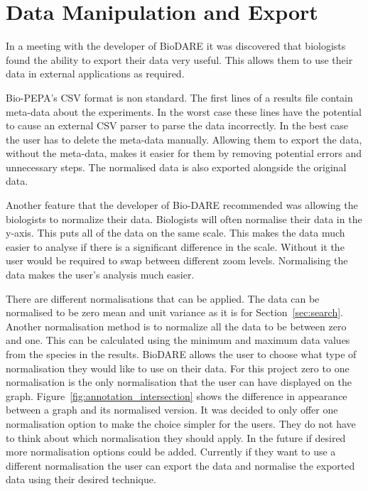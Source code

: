 \section{Data Manipulation and Export}
\label{sec:normalised}

In a meeting with the developer of BioDARE it was discovered that biologists found the ability to export their data very useful.  This allows them to use their data in external applications as required.

Bio-PEPA's CSV format is non standard.  The first lines of a results file contain meta-data about the experiments.  In the worst case these lines have the potential to cause an external CSV parser to parse the data incorrectly.  In the best case the user has to delete the meta-data manually.  Allowing them to export the data, without the meta-data, makes it easier for them by removing potential errors and unnecessary steps.  The normalised data is also exported alongside the original data.

Another feature that the developer of Bio-DARE recommended was allowing the biologists to normalize their data.  Biologists will often normalise their data in the y-axis.  This puts all of the data on the same scale.  This makes the data much easier to analyse if there is a significant difference in the scale.  Without it the user would be required to swap between different zoom levels.  Normalising the data makes the user's analysis much easier.

There are different normalisations that can be applied.  The data can be normalised to be zero mean and unit variance as it is for Section~\ref{sec:search}.  Another normalisation method is to normalize all the data to be between zero and one. This can be calculated using the minimum and maximum data values from the species in the results.  BioDARE allows the user to choose what type of normalisation they would like to use on their data.  For this project zero to one normalisation is the only normalisation that the user can have displayed on the graph. Figure~\ref{fig:annotation_intersection} shows the difference in appearance between a graph and its normalised version. It was decided to only offer one normalisation option to make the choice simpler for the users.  They do not have to think about which normalisation they should apply.  In the future if desired more normalisation options could be added.  Currently if they want to use a different normalisation the user can export the data and normalise the exported data using their desired technique.
